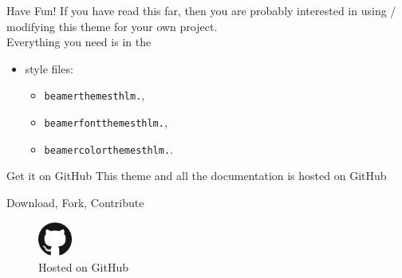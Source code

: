 \documentclass[newPxFont,numfooter,sectionpages]{beamer}
\begin{document}

\begin{frame}[c]{Have Fun!}
If you have read this far, then you are probably interested in using / modifying this theme for your own project. \\
\vspace{1em}
Everything you need is in the

\begin{itemize}
	\item style files:
	\begin{itemize}
		\item \texttt{beamerthemesthlm.},
		\item \texttt{beamerfontthemesthlm.},
		\item \texttt{beamercolorthemesthlm.}.
	\end{itemize}
\end{itemize}

\end{frame}


\begin{frame}[c]{Get it on GitHub}
This theme and all the documentation is hosted on GitHub \\
\vspace{1em}
\begin{center}
\large{Download, Fork, Contribute}

\vspace{1em}

\begin{figure}
	\centerline{\includegraphics[width=0.1\textwidth]{GitHub-Mark-120px-plus.png}}
\caption{Hosted on GitHub}
\end{figure}

\end{center}
\end{frame}
\end{document}

